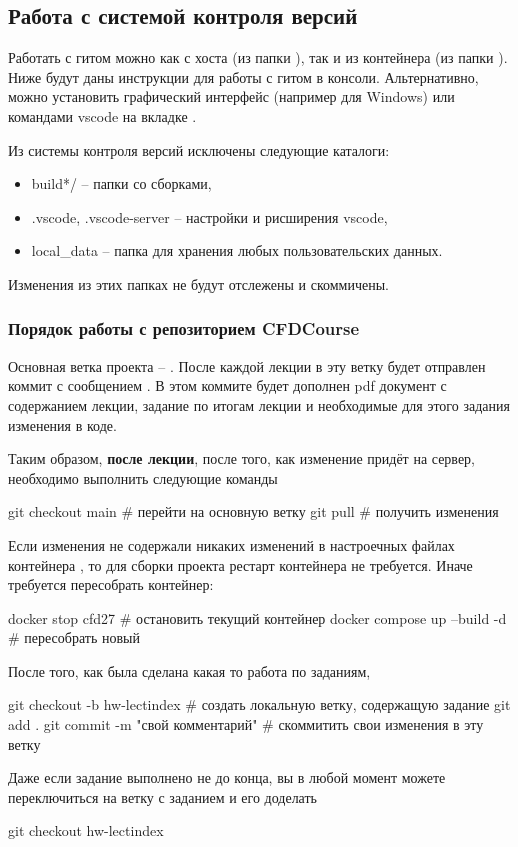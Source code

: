 \subsection{Работа с системой контроля версий}
Работать с гитом можно как с хоста (из папки ),  так и из контейнера (из папки \ename{\app}).
Ниже будут даны инструкции для работы с гитом в консоли.
Альтернативно, можно установить графический интерфейс (например  для Windows)
или командами vscode на вкладке .

Из системы контроля версий исключены следующие каталоги:
\begin{itemize}
\item build*/   -- папки со сборками,
\item .vscode, .vscode-server -- настройки и рисширения vscode,
\item local\_data -- папка для хранения любых пользовательских данных.
\end{itemize}
Изменения из этих папках не будут отслежены и скоммичены.

\subsubsection{Порядок работы с репозиторием CFDCourse}

Основная ветка проекта -- . После каждой лекции в эту ветку будет отправлен коммит с сообщением .
В этом коммите будет дополнен pdf документ с содержанием лекции, задание по итогам лекции и необходимые для этого задания изменения в коде.

Таким образом, {\bf после лекции}, после того, как изменение  придёт на сервер, необходимо выполнить следующие команды
\begin{shelloutput}
git checkout main    # перейти на основную ветку
git pull             # получить изменения
\end{shelloutput}

Если изменения не содержали никаких изменений в настроечных файлах контейнера ,
то для сборки проекта рестарт контейнера не требуется.
Иначе требуется пересобрать контейнер:
\begin{shelloutput}
docker stop cfd27            # остановить текущий контейнер
docker compose up --build -d # пересобрать новый
\end{shelloutput}

После того, как была сделана какая то работа по заданиям,
\begin{shelloutput}
git checkout -b hw-lect{index}      # создать локальную ветку, содержащую задание
git add .
git commit -m "{свой комментарий}"  # скоммитить свои изменения в эту ветку
\end{shelloutput}

Даже если задание выполнено не до конца, вы в любой момент можете переключиться на ветку с заданием и его доделать
\begin{shelloutput}
git checkout hw-lect{index}
\end{shelloutput}
